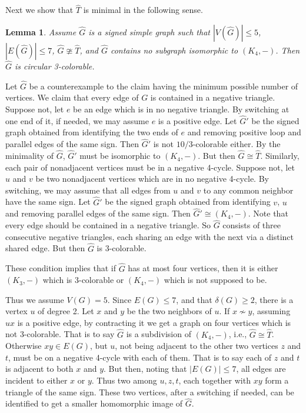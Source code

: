 \documentclass[11pt,a4paper]{article}
\makeatletter
\renewenvironment{proof}[1][\proofname]{\par
	\pushQED{\qed}%
	\normalfont \topsep6\p@\@plus6\p@\relax
	\trivlist
	\item[\hskip\labelsep
	\bfseries
	#1\@addpunct{.}]\ignorespaces
}{%
	\popQED\endtrivlist\@endpefalse
}
\newtheorem{lemma}[theorem]{Lemma}
\theoremstyle{definition}
\makeatother
\begin{document}
	
	Next we show that $\widehat{T}$ is minimal in the following sense.
	
	\begin{lemma}\label{lem:3-colorable}
		Assume $\widehat{G}$ is a signed simple graph such that $|V(\widehat{G})|\leq 5$,  $|E(\widehat{G})|\leq 7$, $\widehat{G}\ncong\widehat{T}$, and $\widehat{G}$ contains no subgraph isomorphic to $(K_4,-)$. Then $\widehat{G}$ is circular 3-colorable. 
	\end{lemma}
	
	\begin{proof}
		Let $\widehat{G}$ be a counterexample  to the claim having the minimum possible number of vertices.  We claim that every edge of $G$ is contained in a negative triangle. Suppose not, let $e$ be an edge which is in no negative triangle. By switching at one end of it, if needed, we may assume $e$ is a positive edge. Let $\widehat{G}'$ be the signed graph obtained from identifying the two ends of $e$ and removing positive loop and parallel edges of the same sign. Then $\widehat{G}'$ is not $10/3$-colorable either. By the minimality of $\widehat{G}$, $\widehat{G}'$ must be isomorphic to $(K_{4},-)$. But then $\widehat{G}\cong \widehat{T}$. Similarly, each pair of nonadjacent vertices must be in a negative 4-cycle.  Suppose not, let $u$ and $v$ be two nonadjacent vertices which are in no negative 4-cycle. By switching, we may assume that all edges from $u$ and $v$ to any common neighbor have the same sign. Let $\widehat{G}'$ be the signed graph obtained from identifying $v$, $u$  and removing parallel edges of the same sign. Then $\widehat{G}' \cong (K_{4},-)$. Note that every edge should be contained in a negative triangle. So $\widehat{G}$ consists of three consecutive negative triangles, each sharing an edge with the next  via a distinct shared edge. But then $\widehat{G}$ is 3-colorable.
		
		
		These condition implies that if $\widehat{G}$ has at most four vertices, then it is either $(K_3, -)$ which is 3-colorable or $(K_4,-)$ which is not supposed to be. 
		
		Thus we assume $V(G)=5$. Since $E(G)\leq 7$, and that $\delta(G)\geq 2$, there is a vertex $u$ of degree 2. Let $x$ and $y$ be the two neighbors of $u$. If $x\nsim y$, assuming $ux$ is a positive edge, by contracting it we get a graph on four vertices which is not 3-colorable. That is to say $\widehat{G}$ is a subdivision of $(K_4,-)$, i.e., $\widehat{G} \cong \widehat{T}$. Otherwise $xy\in E(G)$, but $u$, not being adjacent to the other two vertices $z$ and $t$, must be on a negative 4-cycle with each of them. That is to say each of $z$ and $t$ is adjacent to both $x$ and $y$. But then, noting that $|E(G)|\leq 7$, all edges are incident to either $x$ or $y$. Thus two among $u, z, t$, each together with $xy$ form a triangle of the same sign. These two vertices, after a switching if needed, can be identified to get a smaller homomorphic image of $\widehat{G}$.     
	\end{proof}
	
\end{document}
